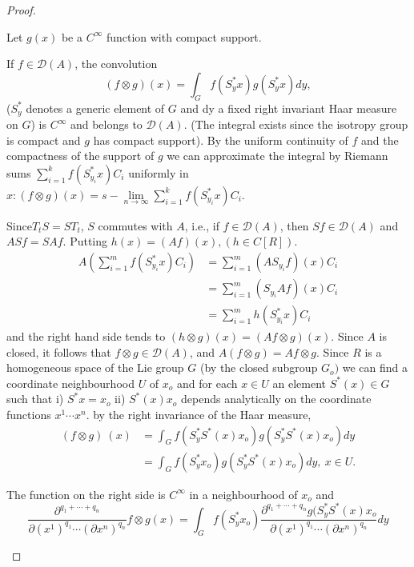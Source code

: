 \begin{proof}
 \begin{Step} %
  Let $g(x)$ be a $C^\infty$ function with compact support. 
  
  If $f \in \mathscr{D} (A)$, the convolution
  $$
  (f \otimes g) (x) = \int_G f(S^*_y x) g(S^*_y x) dy,
  $$
  ($S^*_y$ denotes a generic element of $G$ and dy a fixed right
  invariant Haar measure on $G$) is $C^\infty$ and belongs to
  $\mathscr{D} (A)$. (The integral exists since the isotropy group is
  compact and $g$ has compact support). By the uniform continuity of $f$
  and the compactness of the support of $g$ we can approximate the
  integral by Riemann sums $\sum\limits_{i = 1}^{k} f(S^*_{y_i} x) C_i $
  uniformly in $x: (f \otimes g) (x) = s-\lim\limits_{n \to
   \infty}\sum\limits_{i = 1}^{k} f(S^*_{y_i} x)C_i$. 

  Since\pageoriginale $T_t S=S T_t$, $S$ commutes with $A$, i.e., if $f \in \mathscr{D}(A)$,
  then $S f \in \mathscr{D} (A)$ and $A S f = S A f$. Putting $h(x) =
  (Af) (x), (h \in C [R])$. 
  \begin{align*}
   A\left(\sum^m_{i = 1} f (S^*_{y_i} x ) C_i\right) & = \sum^m_{i = 1} (A S_{y_i}
   f ) (x) C_i\\ 
   & = \sum^m_{i = 1} (S_{y_i} A f) (x) C_i\\
   & = \sum^m_{i = 1} h(S^*_{y_i} x) C_i
  \end{align*}
  and the right hand side tends to $(h \otimes g) (x) = (Af \otimes g)
  (x)$. Since $A$ is closed, it follows that $f \otimes g \in
  \mathscr{D}(A)$, and $A(f \otimes g) = Af \otimes g$. Since $R$ is a
  homogeneous space of the Lie group $G$ (by the closed subgroup $G_o)$
  we can find a coordinate neighbourhood $U$ of $x_o$ and for each $x
  \in U$ an element $S^* (x) \in G$ such that i) $S^* x = x_o$ ii) $S^*
  (x) x_o $ depends analytically on the coordinate functions $x^1 \cdots
  x^n$. by the right invariance of the Haar measure, 
  \begin{align*}
   (f \otimes g) ~ (x) & = \int_G f(S^*_y S^* (x) x_o ) g (S^*_y
   S^*(x) x_o ) dy\\ 
   & = \int_G f(S^*_y x_o) g(S^*_y S^* (x) x_o) dy, ~ x \in U.
  \end{align*}
  
  The function on the right side is $C^\infty$ in a neighbourhood of
  $x_o$ and 
  $$
  \frac{\partial^{q_1 + \cdots + q_n}}{\partial(x^1)^{q_1}\cdots
   (\partial x^n)^{q_n}} f \otimes g(x) = \int_G f(S^*_y x_o
  )\frac{\partial^{q_1 + \cdots + q_n} g(S^*_y S^* (x)
   x_o}{\partial(x^1)^{q_1}\cdots (\partial x^n)^{q_n}} dy 
  $$
 \end{Step}
\end{proof}
